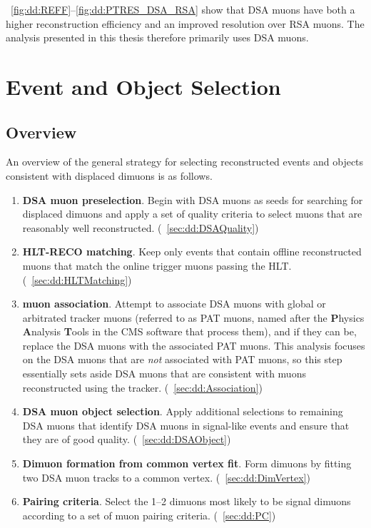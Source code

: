 \Figs~\ref{fig:dd:REFF}--\ref{fig:dd:PTRES_DSA_RSA} show that DSA muons have both a higher reconstruction efficiency and an improved \pT resolution over RSA muons.
The analysis presented in this thesis therefore primarily uses DSA muons.

\section{Event and Object Selection}
\subsection{Overview}
\label{sec:dd:GeneralStrategy}
An overview of the general strategy for selecting reconstructed events and objects consistent with displaced dimuons is as follows.
\clearpage
\begin{enumerate}
  \item \textbf{DSA muon preselection}. Begin with DSA muons as seeds for searching for displaced dimuons and apply a set of quality criteria to select muons that are reasonably well reconstructed. (\Sec~\ref{sec:dd:DSAQuality})
  \item \textbf{HLT-RECO matching}. Keep only events that contain offline reconstructed muons that match the online trigger muons passing the HLT. (\Sec~\ref{sec:dd:HLTMatching})
  \item \textbf{\DSAToPAT muon association}. Attempt to associate DSA muons with global or arbitrated tracker muons (referred to as PAT muons, named after the \textbf{P}hysics \textbf{A}nalysis \textbf{T}ools in the CMS software that process them), and if they can be, replace the DSA muons with the associated PAT muons. This analysis focuses on the DSA muons that are \emph{not} associated with PAT muons, so this step essentially sets aside DSA muons that are consistent with muons reconstructed using the tracker. (\Sec~\ref{sec:dd:Association})
  \item \textbf{DSA muon object selection}. Apply additional selections to remaining DSA muons that identify DSA muons in signal-like events and ensure that they are of good quality. (\Sec~\ref{sec:dd:DSAObject})
  \item \textbf{Dimuon formation from common vertex fit}. Form dimuons by fitting two DSA muon tracks to a common vertex. (\Sec~\ref{sec:dd:DimVertex})
  \item \textbf{Pairing criteria}. Select the 1--2 dimuons most likely to be signal dimuons according to a set of muon pairing criteria. (\Sec~\ref{sec:dd:PC})

\end{enumerate}
